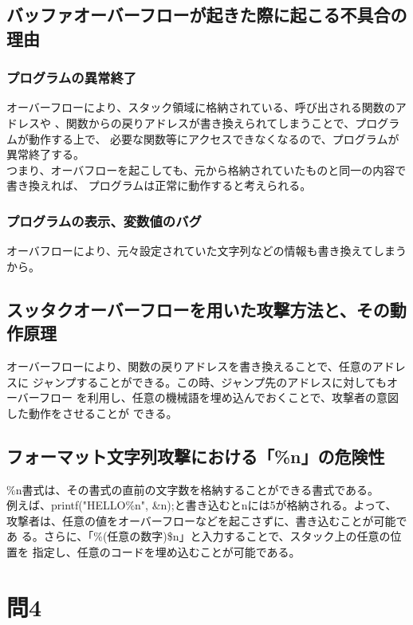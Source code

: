 \documentclass[dvipdfmx,autodetect-engine,titlepage]{jsarticle}
\begin{document}
\subsection{バッファオーバーフローが起きた際に起こる不具合の理由}

\subsubsection*{プログラムの異常終了}
オーバーフローにより、スタック領域に格納されている、呼び出される関数のアドレスや
、関数からの戻りアドレスが書き換えられてしまうことで、プログラムが動作する上で、
必要な関数等にアクセスできなくなるので、プログラムが異常終了する。\\
つまり、オーバフローを起こしても、元から格納されていたものと同一の内容で書き換えれば、
プログラムは正常に動作すると考えられる。

\subsubsection*{プログラムの表示、変数値のバグ}
オーバフローにより、元々設定されていた文字列などの情報も書き換えてしまうから。

\subsection{スッタクオーバーフローを用いた攻撃方法と、その動作原理}
オーバーフローにより、関数の戻りアドレスを書き換えることで、任意のアドレスに
ジャンプすることができる。この時、ジャンプ先のアドレスに対してもオーバーフロー
を利用し、任意の機械語を埋め込んでおくことで、攻撃者の意図した動作をさせることが
できる。

\subsection{フォーマット文字列攻撃における「\%n」の危険性}
\%n書式は、その書式の直前の文字数を格納することができる書式である。\\
例えば、printf("HELLO\%n", \&n);と書き込むとnには5が格納される。よって、
攻撃者は、任意の値をオーバーフローなどを起こさずに、書き込むことが可能であ
る。さらに、「\%(任意の数字)\$n」と入力することで、スタック上の任意の位置を
指定し、任意のコードを埋め込むことが可能である。

\section{問4}
\end{document}
